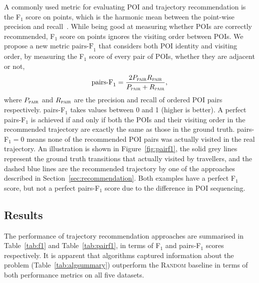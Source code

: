 A commonly used metric for evaluating POI and trajectory recommendation is
the F$_1$ score on points, which is the harmonic mean between the point-wise precision and recall~\cite{ijcai15}.
While being good at measuring whether POIs are correctly recommended,
F$_1$ score on points ignores the visiting order between POIs.
We propose a new metric $\text{pairs-F}_1$ that considers both POI identity and visiting order,
by measuring the F$_1$ score of every pair of POIs,
whether they are adjacent or not,
\eqmoveup
\begin{displaymath}
\text{pairs-F}_1 = \frac{2 P_{\textsc{pair}} R_{\textsc{pair}}}
                        {P_{\textsc{pair}} + R_{\textsc{pair}}},
\end{displaymath}
where $P_{\textsc{pair}}$ and $R_{\textsc{pair}}$ are the precision and recall of ordered POI pairs respectively. 
pairs-F$_1$ takes values between 0 and 1 (higher is better).
A perfect pairs-F$_1$ is achieved if and only if
both the POIs and their visiting order in the
recommended trajectory are exactly the same as those in the ground truth.
pairs-F$_1 = 0$ means none of the recommended POI pairs was actually visited in the real trajectory.
An illustration is shown in Figure~\ref{fig:pairf1},
the solid grey lines represent the ground truth transitions that actually visited by travellers,
and the dashed blue lines are the recommended trajectory by one of the approaches described in Section~\ref{sec:recommendation}.
Both examples have a perfect F$_1$ score, but not a perfect pairs-F$_1$ score due to the difference in POI sequencing.



\subsection{Results}
\label{sec:result}


%
%
%

The performance of trajectory recommendation approaches are summarised in
Table~\ref{tab:f1} and Table~\ref{tab:pairf1},
in terms of F$_1$ and pairs-F$_1$ scores respectively.
It is apparent that algorithms 
captured information about the problem (Table~\ref{tab:algsummary})
outperform the \textsc{Random} baseline in terms of both performance metrics on all five datasets.


